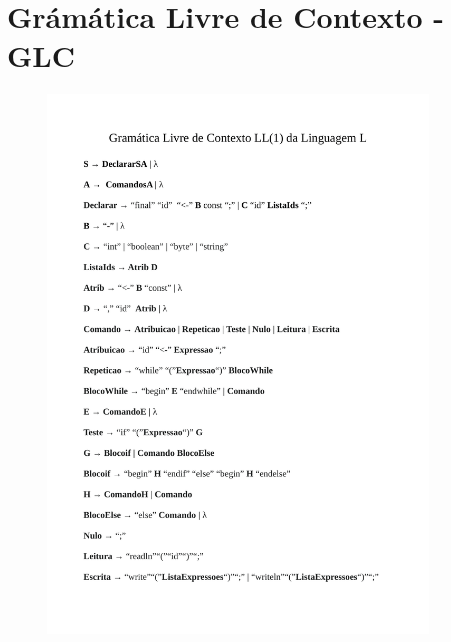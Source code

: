 \section{\esp Grámática Livre de Contexto - GLC}   
\begin{figure}[!ht]
	\vspace{0.2cm}
	\includegraphics[width=0.9\textwidth]{figuras/GLC_LL1-1.png}
	 \vspace{0.2cm}
	\label{fig:figura1}
\end{figure}

